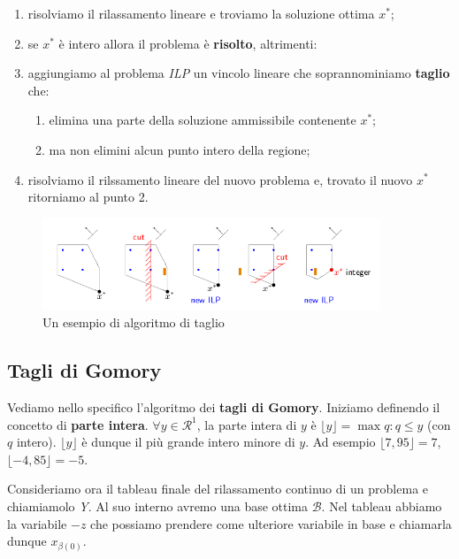 \documentclass[11pt]{book}
\begin{document}
\begin{enumerate}
\item risolviamo il rilassamento lineare e troviamo la soluzione
  ottima $x^*$;
\item se $x^*$ \`e intero allora il problema \`e {\bf risolto},
  altrimenti:
\item aggiungiamo al problema {\em ILP} un vincolo lineare che
  soprannominiamo {\bf taglio} che:

  \begin{enumerate}
  \item elimina una parte della soluzione ammissibile contenente $x^*$;
  \item ma non elimini alcun punto intero della regione;
  \end{enumerate}

\item risolviamo il rilssamento lineare del nuovo problema e, trovato
  il nuovo $x^*$ ritorniamo al punto 2.

\end{enumerate}

\begin{figure}[h!]
  \centering
  \includegraphics[width=0.9\textwidth]{images/esempiotagli.png}
  \caption{Un esempio di algoritmo di taglio}
  \label{esempiotagli}
\end{figure}

\subsection{Tagli di Gomory}

Vediamo nello specifico l'algoritmo dei {\bf tagli di
  Gomory}. Iniziamo definendo il concetto di {\bf parte
  intera}. $\forall y \in \mathcal{R}^1$, la parte intera di $y$ \`e
$\lfloor y \rfloor = \max q : q \leq y$ (con $q$ intero). $\lfloor y
\rfloor$ \`e dunque il pi\`u grande intero minore di $y$. Ad esempio
$\lfloor 7,95 \rfloor = 7$, $\lfloor -4,85 \rfloor = -5$.

Consideriamo ora il tableau finale del rilassamento continuo di un
problema e chiamiamolo {\em Y}. Al suo interno avremo una base ottima
$\mathcal{B}$. Nel tableau abbiamo la variabile $-z$ che possiamo
prendere come ulteriore variabile in base e chiamarla dunque
$x_{\beta(0)}$.
\end{document}
